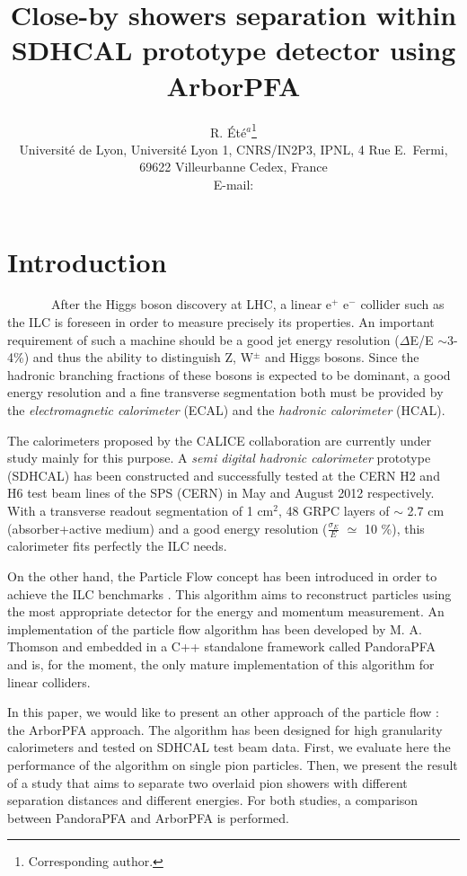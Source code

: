 \documentclass[cits]{JINST}
\title{Close-by showers separation within SDHCAL prototype detector using ArborPFA}
\author{R. \'Et\'e$^a$\thanks{Corresponding author.} \\%
\llap{$^a$} Universit\'e de Lyon, Universit\'e Lyon 1, CNRS/IN2P3, 
 IPNL, 4 Rue E.~Fermi, 69622 Villeurbanne Cedex, France\\
 
 
 E-mail: \email{rete@ipnl.in2p3.fr}
 }
\begin{document}

\section{Introduction}

~~~~~~~After the Higgs boson discovery at LHC, a linear e$^+$ e$^-$ collider such as the ILC is foreseen in order to measure precisely its properties. An important requirement of such a machine should be a good jet energy resolution ($\Delta$E/E $\sim$3-4\%) and thus the ability to distinguish Z, W$^{\pm}$ and Higgs bosons. Since the hadronic branching fractions of these bosons is expected to be dominant, a good energy resolution and a fine transverse segmentation both must be provided by the \textit{electromagnetic calorimeter} (ECAL) and the \textit{hadronic calorimeter} (HCAL).

The calorimeters proposed by the CALICE collaboration are currently under study mainly for this purpose. A \textit{semi digital hadronic calorimeter} prototype (SDHCAL) has been constructed \cite{sdhcal-paper} and successfully tested at the CERN H2 and H6 test beam lines of the SPS (CERN) in May and August 2012 respectively. With a transverse readout segmentation of 1 cm$^2$, 48 GRPC layers of $\sim$ 2.7 cm (absorber+active medium) and a good energy resolution ($\frac{\sigma_{E}}{E}$ $\simeq$ 10 \%), this calorimeter fits perfectly the ILC needs. 

On the other hand, the Particle Flow concept has been introduced in order to achieve the ILC benchmarks \cite{ilc-tdr}. This algorithm aims to reconstruct particles using the most appropriate detector for the energy and momentum measurement. An implementation of the particle flow algorithm has been developed by M. A. Thomson \cite{pandora-pfa} and embedded in a C++ standalone framework called PandoraPFA and is, for the moment, the only mature implementation of this algorithm for linear colliders.

In this paper, we would like to present an other approach of the particle flow : the ArborPFA approach. The algorithm has been designed for high granularity calorimeters and tested on SDHCAL test beam data. First, we evaluate here the performance of the algorithm on single pion particles. Then, we present the result of a study that aims to separate two overlaid pion showers with different separation distances and different energies. For both studies, a comparison between PandoraPFA and ArborPFA is performed.
\end{document}

